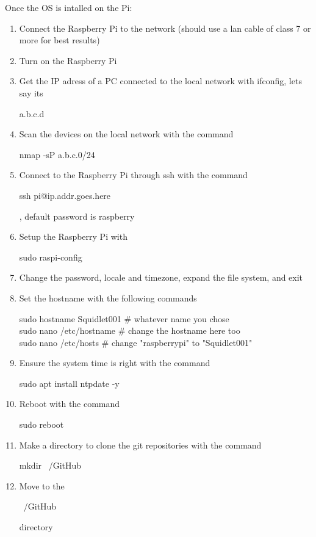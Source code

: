 Once the OS is intalled on the Pi:
\begin{enumerate}
\item Connect the Raspberry Pi to the network (should use a lan cable of class 7 or more for best results)
\item Turn on the Raspberry Pi
\item Get the IP adress of a PC connected to the local network with ifconfig, lets say its \begin{ttfamily}a.b.c.d\end{ttfamily}
\item Scan the devices on the local network with the command \begin{ttfamily}nmap -sP a.b.c.0/24\end{ttfamily}
\item Connect to the Raspberry Pi through ssh with the command \begin{ttfamily}ssh pi@ip.addr.goes.here\end{ttfamily}, default password is raspberry
\item Setup the Raspberry Pi with \begin{ttfamily}sudo raspi-config\end{ttfamily}
\item Change the password, locale and timezone, expand the file system, and exit
\item Set the hostname with the following commands
\begin{ttfamily}
sudo hostname Squidlet001  # whatever name you chose\\
sudo nano /etc/hostname    # change the hostname here too\\
sudo nano /etc/hosts       # change "raspberrypi" to "Squidlet001"
\end{ttfamily}
\item Ensure the system time is right with the command \begin{ttfamily}sudo apt install ntpdate -y\end{ttfamily}
\item Reboot with the command \begin{ttfamily}sudo reboot\end{ttfamily}
\item Make a directory to clone the git repositories with the command \begin{ttfamily}mkdir ~/GitHub\end{ttfamily}
\item Move to the \begin{ttfamily}~/GitHub\end{ttfamily} directory

\end{enumerate}
